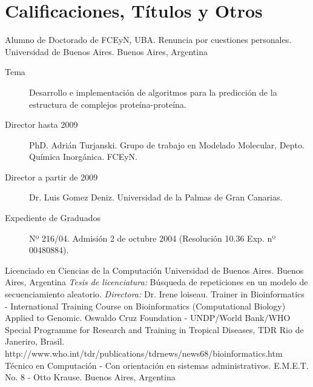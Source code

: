 \section{Calificaciones, Títulos y Otros}\label{otros:desde}

	{Alumno de Doctorado de FCEyN, UBA. Renuncia por cuestiones personales.}
	{Universidad de Buenos Aires.}
	{Buenos Aires, Argentina}
	{}
	{\begin{description}
	\item [Tema] Desarrollo e implementación de algoritmos para la predicción de la estructura de complejos proteína-proteína.
	\item [Director hasta 2009] PhD. Adrián Turjanski. Grupo de trabajo en Modelado Molecular, Depto. Química Inorgánica. FCEyN.	
	\item [Director a partir de 2009] Dr. Luis Gomez Deniz. Universidad de la Palmas de Gran Canarias.
	\item [Expediente de Graduados] Nº 216/04. Admisión 2 de octubre 2004 (Resolución 10.36	Exp. nº 00480884).
	\end{description}}
	{Licenciado en Ciencias de la Computación}
	{Universidad de Buenos Aires.}
	{Buenos Aires, Argentina}
	{}
	{\emph{Tesis de licenciatura:} Búsqueda de repeticiones en un
	modelo de secuenciamiento aleatorio. \emph{Directora:} Dr. Irene loiseau.}
	{Trainer in Bioinformatics - International Training Course on Bioinformatics (Computational Biology) Applied to Genomic.}
	{Oswaldo Cruz Foundation - UNDP/World Bank/WHO Special Programme for Research and Training in Tropical Diseases, TDR}
	{Rio de Janeriro, Brasil.}
	{}
	{http://www.who.int/tdr/publications/tdrnews/news68/bioinformatics.htm}
	{Técnico en Computación - Con orientación en sistemas administrativos.}
	{E.M.E.T. No. 8 - Otto Krause.}
	{Buenos Aires, Argentina}
	{}
	{}

\label{otros:hasta}


